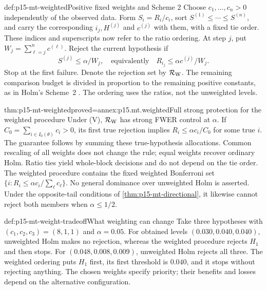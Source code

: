 \begin{hbmethod}{def:p15-mt-weighted}{Positive fixed weights and Scheme 2}
Choose \(c_1,\ldots,c_n>0\) independently of the observed data.
Form \(S_i=R_i/c_i\), sort
\(S^{(1)}\leq\cdots\leq S^{(n)}\), and carry the corresponding
\(i_j,H^{(j)}\) and \(c^{(j)}\) with them, with a fixed tie order.
These indices and superscripts now refer to the ratio ordering.
At step \(j\), put \(W_j=\sum_{\ell=j}^n c^{(\ell)}\).
Reject the current hypothesis if
\[
                  S^{(j)}\leq\alpha/W_j,
       \quad\text{equivalently}\quad
                  R_{i_j}\leq\alpha c^{(j)}/W_j.
\]
Stop at the first failure. Denote the rejection set by
\(\mathcal R_{\rm W}\). The remaining comparison budget is divided in
proportion to the remaining positive constants, as in Holm's Scheme~2
\cite[pp.~69--70]{Holm1979Original}.
The ordering uses the ratios, not the unweighted levels.
\end{hbmethod}

\begin{hbtheorem}{thm:p15-mt-weighted}{proved=annex:p15.mt.weighted}{Full strong protection for the weighted procedure}
Under (V), \(\mathcal R_{\rm W}\) has strong FWER control at \(\alpha\).
If \(C_0=\sum_{i\in I_0(\theta)}c_i>0\), its first true rejection implies
\(R_i\leq\alpha c_i/C_0\) for some true \(i\).
The guarantee follows by summing these true-hypothesis allocations.
Common rescaling of all weights does not change the rule; equal weights
recover ordinary Holm. Ratio ties yield whole-block decisions and do
not depend on the tie order. The weighted procedure contains the
fixed weighted Bonferroni set
\(\{i:R_i\leq\alpha c_i/\sum_\ell c_\ell\}\).
No general dominance over unweighted Holm is asserted.
Under the opposite-tail conditions of \cref{thm:p15-mt-directional},
it likewise cannot reject both members when \(\alpha\leq1/2\).
\end{hbtheorem}

\begin{hbexample}{def:p15-mt-weight-tradeoff}{What weighting can change}
Take three hypotheses with \((c_1,c_2,c_3)=(8,1,1)\) and \(\alpha=0.05\).
For obtained levels \((0.030,0.040,0.040)\), unweighted Holm makes no
rejection, whereas the weighted procedure rejects \(H_1\) and then stops.
For \((0.048,0.008,0.009)\), unweighted Holm rejects all three.
The weighted ordering puts \(H_1\) first, its first threshold is \(0.040\),
and it stops without rejecting anything. The chosen weights specify
priority; their benefits and losses depend on the alternative configuration.
\end{hbexample}

